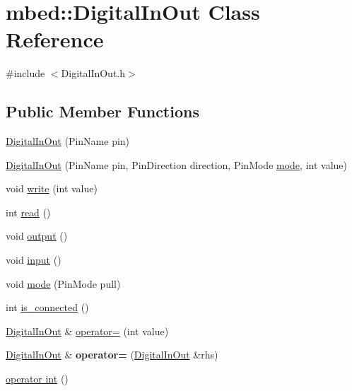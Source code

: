\hypertarget{classmbed_1_1_digital_in_out}{}\section{mbed\+:\+:Digital\+In\+Out Class Reference}
\label{classmbed_1_1_digital_in_out}


{\ttfamily \#include $<$Digital\+In\+Out.\+h$>$}

\subsection*{Public Member Functions}
\begin{DoxyCompactItemize}
\item 
\hyperlink{classmbed_1_1_digital_in_out_a45aeb16f525f8fd23b468b761d44034a}{Digital\+In\+Out} (Pin\+Name pin)
\item 
\hyperlink{classmbed_1_1_digital_in_out_acdebfaf292d2c361db6a3040e4d34c8c}{Digital\+In\+Out} (Pin\+Name pin, Pin\+Direction direction, Pin\+Mode \hyperlink{classmbed_1_1_digital_in_out_ac055602d6e364974d9096d6a9cdeaa45}{mode}, int value)
\item 
void \hyperlink{classmbed_1_1_digital_in_out_a2407c36ddf7aeca0a3d941d13001431b}{write} (int value)
\item 
int \hyperlink{classmbed_1_1_digital_in_out_a19cf94937f2ab85012fc5418e5808c44}{read} ()
\item 
void \hyperlink{classmbed_1_1_digital_in_out_acc847afdb691a4628ac23612d7944e6b}{output} ()
\item 
void \hyperlink{classmbed_1_1_digital_in_out_acc7775ff8fe2e40cc2882ce2a2e2e3d0}{input} ()
\item 
void \hyperlink{classmbed_1_1_digital_in_out_ac055602d6e364974d9096d6a9cdeaa45}{mode} (Pin\+Mode pull)
\item 
int \hyperlink{classmbed_1_1_digital_in_out_a185f22a87707167a3841e1d62b6e2736}{is\+\_\+connected} ()
\item 
\hyperlink{classmbed_1_1_digital_in_out}{Digital\+In\+Out} \& \hyperlink{classmbed_1_1_digital_in_out_a055dae2e002e9a95a06462746fb1685f}{operator=} (int value)
\item 
\hyperlink{classmbed_1_1_digital_in_out}{Digital\+In\+Out} \& {\bfseries operator=} (\hyperlink{classmbed_1_1_digital_in_out}{Digital\+In\+Out} \&rhs)\hypertarget{classmbed_1_1_digital_in_out_a6d1174bf281a925f52a63157819425d9}{}\label{classmbed_1_1_digital_in_out_a6d1174bf281a925f52a63157819425d9}

\item 
\hyperlink{classmbed_1_1_digital_in_out_ace8466be1d1a836a1ecb1dd1621af7a2}{operator int} ()
\end{DoxyCompactItemize}
